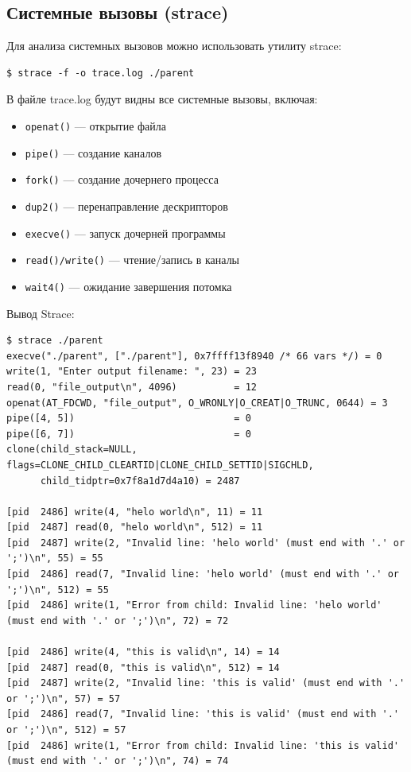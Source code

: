 \subsection{Системные вызовы (strace)}
Для анализа системных вызовов можно использовать утилиту strace:
\begin{verbatim}
$ strace -f -o trace.log ./parent
\end{verbatim}

В файле trace.log будут видны все системные вызовы, включая:
\begin{itemize}
    \item \texttt{openat()} — открытие файла
    \item \texttt{pipe()} — создание каналов
    \item \texttt{fork()} — создание дочернего процесса
    \item \texttt{dup2()} — перенаправление дескрипторов
    \item \texttt{execve()} — запуск дочерней программы
    \item \texttt{read()/write()} — чтение/запись в каналы
    \item \texttt{wait4()} — ожидание завершения потомка
\end{itemize}

Вывод Strace:

\begin{verbatim}
$ strace ./parent
execve("./parent", ["./parent"], 0x7ffff13f8940 /* 66 vars */) = 0
write(1, "Enter output filename: ", 23) = 23
read(0, "file_output\n", 4096)          = 12
openat(AT_FDCWD, "file_output", O_WRONLY|O_CREAT|O_TRUNC, 0644) = 3
pipe([4, 5])                            = 0
pipe([6, 7])                            = 0
clone(child_stack=NULL, flags=CLONE_CHILD_CLEARTID|CLONE_CHILD_SETTID|SIGCHLD, 
      child_tidptr=0x7f8a1d7d4a10) = 2487

[pid  2486] write(4, "helo world\n", 11) = 11
[pid  2487] read(0, "helo world\n", 512) = 11
[pid  2487] write(2, "Invalid line: 'helo world' (must end with '.' or ';')\n", 55) = 55
[pid  2486] read(7, "Invalid line: 'helo world' (must end with '.' or ';')\n", 512) = 55
[pid  2486] write(1, "Error from child: Invalid line: 'helo world' (must end with '.' or ';')\n", 72) = 72

[pid  2486] write(4, "this is valid\n", 14) = 14
[pid  2487] read(0, "this is valid\n", 512) = 14
[pid  2487] write(2, "Invalid line: 'this is valid' (must end with '.' or ';')\n", 57) = 57
[pid  2486] read(7, "Invalid line: 'this is valid' (must end with '.' or ';')\n", 512) = 57
[pid  2486] write(1, "Error from child: Invalid line: 'this is valid' (must end with '.' or ';')\n", 74) = 74
\end{verbatim}

\pagebreak
